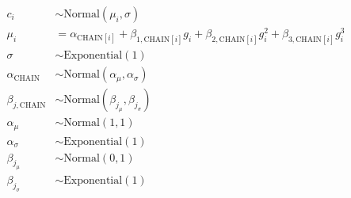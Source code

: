 \documentclass[doc,biblatex]{apa7}
\begin{document}
\begin{equation}
\begin{aligned}
   c_i                   & \sim \mathrm{Normal}(\mu_i, \sigma) \\
 \mu_i                   & = \alpha_{\mathrm{CHAIN}[i]} + \beta_{1,\mathrm{CHAIN}[i]} g_i + \beta_{2,\mathrm{CHAIN}[i]} g_i^2 + \beta_{3,\mathrm{CHAIN}[i]} g_i^3 \\
\sigma                   & \sim \mathrm{Exponential}(1) \\
\alpha_{\mathrm{CHAIN}}  & \sim \mathrm{Normal}(\alpha_\mu, \alpha_\sigma) \\
\beta_{j,\mathrm{CHAIN}} & \sim \mathrm{Normal}(\beta_{j_\mu}, \beta_{j_\sigma}) \\
\alpha_\mu               & \sim \mathrm{Normal}(1, 1) \\
\alpha_\sigma            & \sim \mathrm{Exponential}(1) \\
\beta_{j_\mu}            & \sim \mathrm{Normal}(0, 1) \\
\beta_{j_\sigma}         & \sim \mathrm{Exponential}(1)
\end{aligned}
\end{equation}
\end{document}
